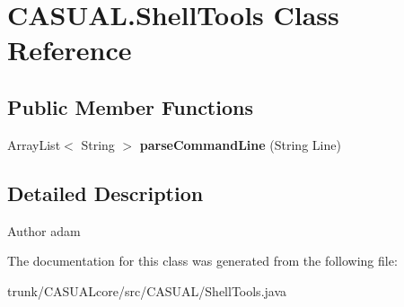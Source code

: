 \hypertarget{classCASUAL_1_1ShellTools}{\section{C\-A\-S\-U\-A\-L.\-Shell\-Tools Class Reference}
\label{classCASUAL_1_1ShellTools}
}
\subsection*{Public Member Functions}
\begin{DoxyCompactItemize}
\item 
\hypertarget{classCASUAL_1_1ShellTools_a5e9a915e6325d2d35f0afb4c7ff75723}{Array\-List$<$ String $>$ {\bfseries parse\-Command\-Line} (String Line)}\label{classCASUAL_1_1ShellTools_a5e9a915e6325d2d35f0afb4c7ff75723}

\end{DoxyCompactItemize}


\subsection{Detailed Description}
\begin{DoxyAuthor}{Author}
adam 
\end{DoxyAuthor}


The documentation for this class was generated from the following file\-:\begin{DoxyCompactItemize}
\item 
trunk/\-C\-A\-S\-U\-A\-Lcore/src/\-C\-A\-S\-U\-A\-L/Shell\-Tools.\-java\end{DoxyCompactItemize}
